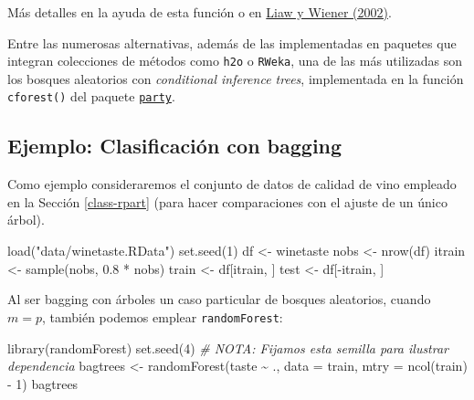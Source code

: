 \documentclass[
]{book}
\newenvironment{Shaded}{\begin{snugshade}}{\end{snugshade}}
\newcommand{\AttributeTok}[1]{\textcolor[rgb]{0.77,0.63,0.00}{#1}}
\newcommand{\CommentTok}[1]{\textcolor[rgb]{0.56,0.35,0.01}{\textit{#1}}}
\newcommand{\DecValTok}[1]{\textcolor[rgb]{0.00,0.00,0.81}{#1}}
\newcommand{\FloatTok}[1]{\textcolor[rgb]{0.00,0.00,0.81}{#1}}
\newcommand{\FunctionTok}[1]{\textcolor[rgb]{0.00,0.00,0.00}{#1}}
\newcommand{\NormalTok}[1]{#1}
\newcommand{\OtherTok}[1]{\textcolor[rgb]{0.56,0.35,0.01}{#1}}
\newcommand{\SpecialCharTok}[1]{\textcolor[rgb]{0.00,0.00,0.00}{#1}}
\newcommand{\StringTok}[1]{\textcolor[rgb]{0.31,0.60,0.02}{#1}}
\theoremstyle{break}
\theoremstyle{definition}
\theoremstyle{definition}
\theoremstyle{definition}
\theoremstyle{definition}
\theoremstyle{remark}
\begin{document}
Más detalles en la ayuda de esta función o en \href{https://www.r-project.org/doc/Rnews/Rnews_2002-3.pdf}{Liaw y Wiener (2002)}.

Entre las numerosas alternativas, además de las implementadas en paquetes que integran colecciones de métodos como \texttt{h2o} o \texttt{RWeka}, una de las más utilizadas son los bosques aleatorios con \emph{conditional inference trees}, implementada en la función \texttt{cforest()} del paquete \href{https://CRAN.R-project.org/package=party}{\texttt{party}}.

\hypertarget{ejemplo-clasificaciuxf3n-con-bagging}{%
\subsection{Ejemplo: Clasificación con bagging}\label{ejemplo-clasificaciuxf3n-con-bagging}}

Como ejemplo consideraremos el conjunto de datos de calidad de vino empleado en la Sección \ref{class-rpart} (para hacer comparaciones con el ajuste de un único árbol).

\begin{Shaded}
\begin{Highlighting}[]
\FunctionTok{load}\NormalTok{(}\StringTok{"data/winetaste.RData"}\NormalTok{)}
\FunctionTok{set.seed}\NormalTok{(}\DecValTok{1}\NormalTok{)}
\NormalTok{df }\OtherTok{\textless{}{-}}\NormalTok{ winetaste}
\NormalTok{nobs }\OtherTok{\textless{}{-}} \FunctionTok{nrow}\NormalTok{(df)}
\NormalTok{itrain }\OtherTok{\textless{}{-}} \FunctionTok{sample}\NormalTok{(nobs, }\FloatTok{0.8} \SpecialCharTok{*}\NormalTok{ nobs)}
\NormalTok{train }\OtherTok{\textless{}{-}}\NormalTok{ df[itrain, ]}
\NormalTok{test }\OtherTok{\textless{}{-}}\NormalTok{ df[}\SpecialCharTok{{-}}\NormalTok{itrain, ]}
\end{Highlighting}
\end{Shaded}

Al ser bagging con árboles un caso particular de bosques aleatorios, cuando \(m = p\), también podemos emplear \texttt{randomForest}:

\begin{Shaded}
\begin{Highlighting}[]
\FunctionTok{library}\NormalTok{(randomForest)}
\FunctionTok{set.seed}\NormalTok{(}\DecValTok{4}\NormalTok{) }\CommentTok{\# NOTA: Fijamos esta semilla para ilustrar dependencia}
\NormalTok{bagtrees }\OtherTok{\textless{}{-}} \FunctionTok{randomForest}\NormalTok{(taste }\SpecialCharTok{\textasciitilde{}}\NormalTok{ ., }\AttributeTok{data =}\NormalTok{ train, }\AttributeTok{mtry =} \FunctionTok{ncol}\NormalTok{(train) }\SpecialCharTok{{-}} \DecValTok{1}\NormalTok{)}
\NormalTok{bagtrees}
\end{Highlighting}
\end{Shaded}
\end{document}
